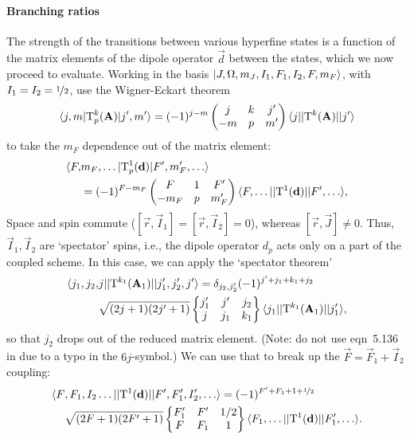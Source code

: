 \paragraph{Branching ratios}

The strength of the transitions between various hyperfine states is a function
of the matrix elements of the dipole operator $\vec d$ between the states, which
we now proceed to evaluate. Working in the basis
$|J,\Omega,m_J,I_1,F_1,I_2,F,m_F\rangle$, with $I_1=I_2=\nicefrac{1}{2}$, use the
Wigner-Eckart theorem \cite[eqn~5.172]{brown2003rotational}
%
\begin{equation}
    \label{wignereckart}
    \langle j,m|\mathrm{T}_p^k(\mathbf{A})|j',m'\rangle=(-1)^{j-m}
    \begin{pmatrix}j&k&j'\\-m&p&m'\end{pmatrix}
    \langle j||\mathrm{T}^k(\mathbf{A})||j'\rangle
\end{equation}
%
to take the $m_F$ dependence out of the matrix element:
%
\begin{align}
    \label{useWE1}
    \langle F,&m_F,\ldots|\mathrm{T}_p^1(\mathbf{d})|F',m_F',\ldots\rangle
    \\&=\nonumber
    (-1)^{F-m_F}\begin{pmatrix}F&1&F'\\-m_F&p&m_F'\end{pmatrix}
    \langle F,\ldots||\mathrm{T}^1(\mathbf{d})||F',\ldots\rangle,
\end{align}
%
Space and spin commute ($[\vec r,\vec I_1]=[\vec r,\vec I_2]=0$), whereas $[\vec
r,\vec J]\ne0$. Thus, $\vec I_1,\vec I_2$ are `spectator' spins, i.e., the
dipole operator $d_p$ acts only on a part of the coupled scheme. In this case,
we can apply the `spectator theorem' \cite[eqn~5.174]{brown2003rotational}
%
\begin{equation}
    \label{spectatortheorem}
\begin{aligned}
    \langle j_1,j_2,&j||\mathrm{T}^{k_1}(\mathbf{A}_1)||j_1',j_2',j'\rangle
    =
    \delta_{j_2,j_2'}(-1)^{j'+j_1+k_1+j_2}\\
    &\sqrt{(2j+1)(2j'+1)}
    \begin{Bmatrix}j_1'&j'&j_2\\j&j_1&k_1\end{Bmatrix}
    \langle j_1||\mathrm{T}^{k_1}(\mathbf{A}_1)||j_1'\rangle,
\end{aligned}
\end{equation}
%
so that $j_2$ drops out of the reduced matrix element. (Note: do not use
eqn~5.136 in \cite{brown2003rotational} due to a typo in the $6j$-symbol.) We
can use that to break up the $\vec F=\vec F_1+\vec I_2$ coupling:
%
\begin{align}
    \label{useST1}
    \langle F&,F_1,I_2\ldots||\mathrm{T}^1(\mathbf{d})||F',F_1',I_2',\ldots\rangle
    =(-1)^{F'+F_1+1+\nicefrac{1}{2}}\\\nonumber
    &\sqrt{(2F+1)(2F'+1)}
    \begin{Bmatrix}F_1'&F'&1/2\\F&F_1&1\end{Bmatrix}
    \langle F_1,\ldots||\mathrm{T}^1(\mathbf{d})||F_1',\ldots\rangle.
\end{align}
